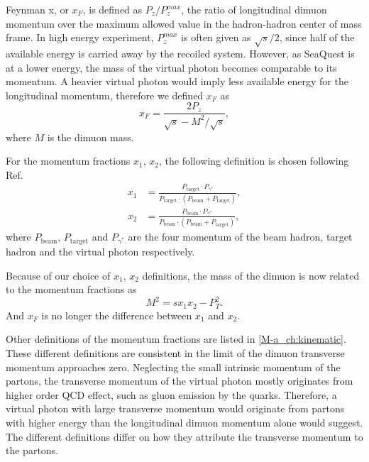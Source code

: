 \documentclass[../main.tex]{subfiles}
\begin{document}
Feynman x, or $x_F$, is defined as $P_z/P_z^{max}$, the ratio of longitudinal dimuon momentum
over the maximum allowed value in the hadron-hadron center of mass frame. In high energy
experiment, $P_z^{max}$ is often given as $\sqrt{s}/2$, since half of the available energy is
carried away by the recoiled system.
However, as SeaQuest is at a lower energy, the mass of the virtual photon becomes comparable to its momentum.
A heavier virtual photon would imply less available energy for the longitudinal momentum,
therefore we defined $x_F$ as
\begin{equation}
	x_F = \frac{2P_z}{\sqrt{s}-M^2/\sqrt{s}},
\end{equation}
where $M$ is the dimuon mass.

For the momentum fractions $x_1$, $x_2$, the following definition is chosen following Ref.~\cite{Coester-1286}
\begin{equation}
	\begin{split}
		x_1 &= \frac{P_{\textrm{target}}\cdot P_{\gamma^*}}{P_{\textrm{target}}\cdot (P_{\textrm{beam}}+P_{\textrm{target}})},\\
		x_2 &= \frac{P_{\textrm{beam}}\cdot P_{\gamma^*}}{P_{\textrm{beam}}\cdot (P_{\textrm{beam}}+P_{\textrm{target}})},
	\end{split}
\end{equation}
where $P_{\textrm{beam}}$, $P_{\textrm{target}}$ and $P_{\gamma^*}$ are the four momentum of the
beam hadron, target hadron and the virtual photon respectively.

Because of our choice of $x_1$, $x_2$ definitions, the mass of the dimuon is now related to
the momentum fractions as
\begin{equation}
	M^2= sx_1x_2-P_T^2.
\end{equation}
And $x_F$ is no longer the difference between $x_1$ and $x_2$.

Other definitions of the momentum fractions are listed in \cref{M-a_ch:kinematic}. These different definitions
are consistent in the limit of the dimuon transverse momentum approaches zero.
Neglecting the small intrinsic momentum of the partons,
the transverse momentum of the virtual photon mostly originates from higher order QCD effect, such as gluon
emission by the quarks. Therefore, a virtual photon with large transverse momentum would originate
from partons with higher energy than the longitudinal dimuon momentum alone would suggest. The different
definitions differ on how they attribute the transverse momentum to the partons.
\end{document}
